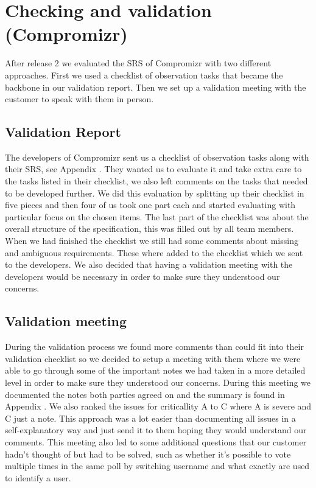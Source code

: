 \documentclass[10pt]{article}
\begin{document}
\section{Checking and validation (Compromizr)}
After release 2 we evaluated the SRS of Compromizr with two different approaches. First we used a checklist of observation tasks that became the backbone in our validation report. Then we set up a validation meeting with the customer to speak with them in person.
\subsection{Validation Report}
The developers of Compromizr sent us a checklist of observation tasks along with their SRS, see Appendix \cite{CompromizrChecklist}. They wanted us to evaluate it and take extra care to the tasks listed in their checklist, we also left comments on the tasks that needed to be developed further. We did this evaluation by splitting up their checklist in five pieces and then four of us took one part each and started evaluating with particular focus on the chosen items. The last part of the checklist was about the overall structure of the specification, this was filled out by all team members.
When we had finished the checklist we still had some comments about missing and ambiguous requirements. These where added to the checklist which we sent to the developers. We also decided that having a validation meeting with the developers would be necessary in order to make sure they understood our concerns.

\subsection{Validation meeting}
During the validation process we found more comments than could fit into their validation checklist so we decided to setup a meeting
with them where we were able to go through some of the important notes we had taken in a more detailed level in order to make sure they understood our concerns.  During this meeting we documented the notes both parties agreed on and the summary is found in Appendix \cite{CompromizrValidationMeeting}. We also ranked the issues for criticallity A to C where A is severe and C just a note. This approach was a lot easier than documenting all issues in a self-explanatory way and just send it to them hoping they would understand our comments. This meeting also led to some additional questions that our customer hadn't thought of but had to be solved, such as whether it's possible to vote multiple times in the same poll by switching username and what exactly are used to identify a user.
\end{document}
